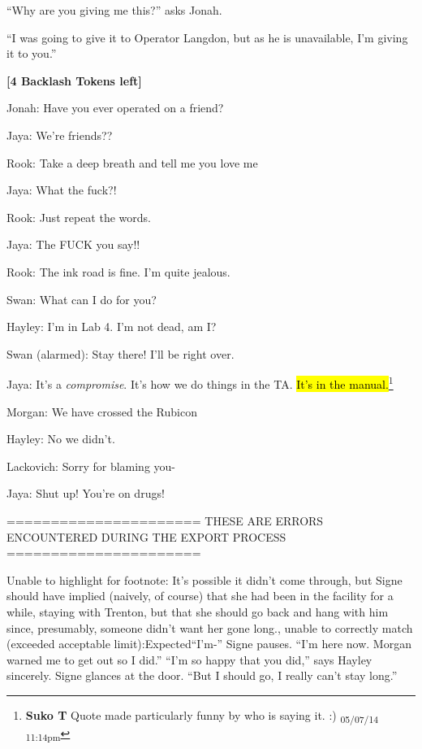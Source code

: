 ``Why are you giving me this?'' asks Jonah.

``I was going to give it to Operator Langdon, but as he is unavailable, I'm giving it to you.''





\textbf{{[}4 Backlash Tokens left{]}}







Jonah: Have you ever operated on a friend?

Jaya: We're friends??



Rook: Take a deep breath and tell me you love me

Jaya: What the fuck?!

Rook: Just repeat the words.

Jaya: The FUCK you say!!



Rook: The ink road is fine.  I'm quite jealous.



Swan: What can I do for you?

Hayley: I'm in Lab 4.  I'm not dead, am I?

Swan (alarmed): Stay there!  I'll be right over.



Jaya: It's a \textit{compromise}.  It's how we do things in the TA.  \hl{It's in the manual.}\footnote{\textbf{Suko T }Quote made particularly funny by who is saying it. :) \textsubscript{05/07/14 11:14pm}}



Morgan: We have crossed the Rubicon

Hayley: No we didn't.



Lackovich: Sorry for blaming you-

Jaya: Shut up! You're on drugs!


\iffalse

======================
THESE ARE ERRORS ENCOUNTERED DURING THE EXPORT PROCESS
======================

	Unable to highlight for footnote: It's possible it didn't come through, but Signe should have implied (naively, of course) that she had been in the facility for a while, staying with Trenton, but that she should go back and hang with him since, presumably, someone didn't want her gone long., unable to correctly match (exceeded acceptable limit):Expected“I’m-” Signe pauses.  “I’m here now.  Morgan warned me to get out so I did.” 
“I’m so happy that you did,” says Hayley sincerely.
Signe glances at the door.  “But I should go, I really can’t stay long.”

